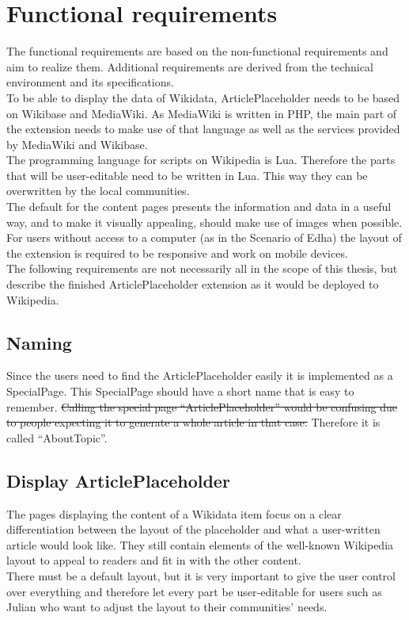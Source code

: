 \chapter {Functional requirements}

The functional requirements are based on the non-functional requirements and aim to realize them. Additional requirements are derived from the technical environment and its specifications. \\
To be able to display the data of Wikidata, ArticlePlaceholder needs to be based on Wikibase and MediaWiki.
As MediaWiki is written in PHP, the main part of the extension needs to make use of that language as well as the services provided by MediaWiki and Wikibase. \\
The programming language for scripts on Wikipedia is Lua. Therefore the parts that will be user-editable need to be written in Lua. This way they can be overwritten by the local communities. \\
The default for the content pages presents the information and data in a useful way, and to make it visually appealing, should make use of images when possible.
For users without access to a computer (as in the Scenario of Edha) the layout of the extension is required to be responsive and work on mobile devices. \\
The following requirements are not necessarily all in the scope of this thesis, but describe the finished ArticlePlaceholder extension as it would be deployed to Wikipedia.

\section{Naming}
Since the users need to find the ArticlePlaceholder easily it is implemented as a SpecialPage. This SpecialPage should have a short name that is easy to remember. \st{Calling the special page ``ArticlePlaceholder'' would be confusing due to people expecting it to generate a whole article in that case.}  Therefore it is called ``AboutTopic''.

\section{Display ArticlePlaceholder}
The pages displaying the content of a Wikidata item focus on a clear differentiation between the layout of the placeholder and what a user-written article would look like. They still contain elements of the well-known Wikipedia layout to appeal to readers and fit in with the other content. \\
There must be a default layout, but it is very important to give the user control over everything and therefore let every part be user-editable for users such as Julian who want to adjust the layout to their communities' needs.

